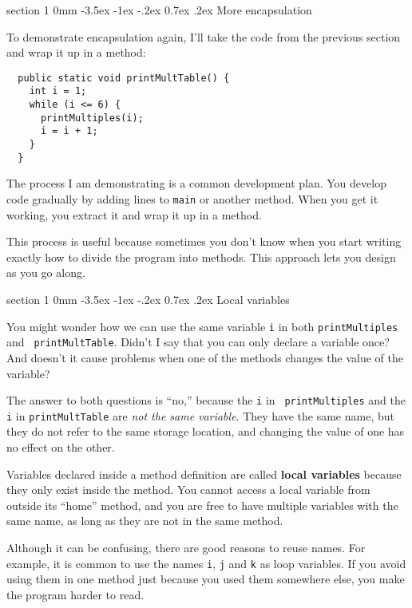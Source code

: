 \documentclass{book}
\makeatletter
\renewcommand{\section}{\@startsection 
    {section} {1} {0mm}%
    {-3.5ex \@plus -1ex \@minus -.2ex}%
    {0.7ex \@plus.2ex}%
    {\normalfont\Large\bfseries}}
\makeatother
\begin{document}
\section{More encapsulation}

To demonstrate encapsulation again, I'll take the code
from the previous section and wrap it up in a method:

\begin{verbatim}
  public static void printMultTable() {
    int i = 1;
    while (i <= 6) {
      printMultiples(i);
      i = i + 1;
    }
  }
\end{verbatim}
%
The process I am demonstrating is a common 
development plan.  You develop code gradually by adding
lines to {\tt main} or another method.  When you get
it working, you extract it and wrap it up in a method.

This process is useful because sometimes you don't know
when you start writing exactly how to divide the program into
methods.  This approach lets you design as you go along.


\section{Local variables}

You might wonder how we can use the same
variable {\tt i} in both {\tt printMultiples} and {\tt
printMultTable}.  Didn't I say that you can only declare a variable
once?  And doesn't it cause problems when one of the methods changes
the value of the variable?

The answer to both questions is ``no,'' because the {\tt i} in {\tt
printMultiples} and the {\tt i} in {\tt printMultTable} are
{\em not the same variable}.  They have the same name, but
they do not refer to the same storage location, and changing
the value of one has no effect on the other.

Variables declared inside a method definition are
called {\bf local variables} because they only exist inside
the method.  You cannot access a local variable from outside
its ``home'' method, and you are free to have multiple
variables with the same name, as long as they are not in
the same method.

Although it can be confusing, there are good
reasons to reuse names.  For example, it is common to
use the names {\tt i}, {\tt j} and {\tt k} as loop variables.
If you avoid using them in one method just because you
used them somewhere else, you make the program
harder to read.
\end{document}
